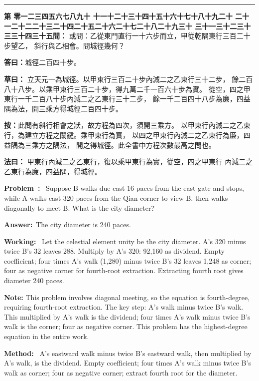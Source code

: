 \documentclass[9pt,a4paper]{article}
\newcounter{probnum}
\newcounter{overallnum}
\newcommand{\chnum}[1]{%
  \ifcase#1 零\or 一\or 二\or 三\or 四\or 五\or 六\or 七\or 八\or 九\or 十\or
    十一\or 十二\or 十三\or 十四\or 十五\or 十六\or 十七\or 十八\or 十九\or 二十\or
    二十一\or 二十二\or 二十三\or 二十四\or 二十五\or 二十六\or 二十七\or 二十八\or 二十九\or 三十\or
    三十一\or 三十二\or 三十三\or 三十四\or 三十五\fi}
\newcommand{\problem}[1]{\stepcounter{probnum}\stepcounter{overallnum}\par\noindent\textbf{\color{volcolor}第\chnum{\value{probnum}}問：}#1\par\vspace{0.15cm}}
\newcommand{\answer}[1]{\par\noindent\textbf{答曰：}#1\par\vspace{0.15cm}}
\newcommand{\working}[1]{\par\noindent\textbf{草曰：}#1\par\vspace{0.15cm}}
\newcommand{\method}[1]{\par\noindent\textbf{法曰：}#1\par\vspace{0.25cm}}
\newcommand{\eproblem}[1]{\par\noindent\textbf{\color{volcolor}Problem~\theoverallnum:}~#1\par\vspace{0.15cm}}
\newcommand{\eanswer}[1]{\par\noindent\textbf{Answer:}~#1\par\vspace{0.15cm}}
\newcommand{\eworking}[1]{\par\noindent\textbf{Working:}~#1\par\vspace{0.15cm}}
\newcommand{\emethod}[1]{\par\noindent\textbf{Method:}~#1\par\vspace{0.25cm}}
\begin{document}
\vspace{0.15cm}
\noindent\rule{\textwidth}{0.2pt}
\vspace{0.15cm}

\noindent\begin{minipage}[t]{0.48\textwidth}
\problem{
或問：乙從東門直行一十六步而立，甲從乾隅東行三百二十步望乙，
斜行與乙相會。問城徑幾何？
}

\answer{城徑二百四十步。}

\working{
立天元一為城徑。以甲東行三百二十步內減二之乙東行三十二步，
餘二百八十八步。以乘甲東行三百二十步，得九萬二千一百六十步為實。
從空，四之甲東行一千二百八十步內減二之乙東行三十二步，
餘一千二百四十八步為廉，四益隅為法，開三乘方得城徑二百四十步。

\textbf{按：}此問有斜行相會之狀，故方程為四次，須開三乘方。
以甲東行內減二之乙東行，為建立方程之關鍵。乘甲東行為實，
以四之甲東行內減二之乙東行為廉，四益隅為三乘方之隅法，
開之得城徑。此全書中方程次數最高之問也。
}

\method{
甲東行內減二之乙東行，復以乘甲東行為實，從空，四之甲東行
內減二之乙東行為廉，四益隅，得城徑。
}
\end{minipage}%
\hfill%
\begin{minipage}[t]{0.50\textwidth}
\eproblem{
Suppose B walks due east 16 paces from the east gate and stops, while A walks
east 320 paces from the Qian corner to view B, then walks diagonally to meet
B. What is the city diameter?
}

\eanswer{The city diameter is 240 paces.}

\eworking{
Let the celestial element unity be the city diameter. A's 320 minus twice
B's 32 leaves 288. Multiply by A's 320: 92,160 as dividend. Empty coefficient;
four times A's walk (1,280) minus twice B's 32 leaves 1,248 as corner;
four as negative corner for fourth-root extraction. Extracting fourth root
gives diameter 240 paces.

\textbf{Note:} This problem involves diagonal meeting, so the equation is
fourth-degree, requiring fourth-root extraction. The key step: A's walk minus
twice B's walk. This multiplied by A's walk is the dividend; four times A's
walk minus twice B's walk is the corner; four as negative corner. This
problem has the highest-degree equation in the entire work.
}

\emethod{
A's eastward walk minus twice B's eastward walk, then multiplied by A's walk,
is the dividend. Empty coefficient; four times A's walk minus twice B's walk
as corner; four as negative corner; extract fourth root for the diameter.
}
\end{minipage}
\vspace{0.15cm}
\end{document}
